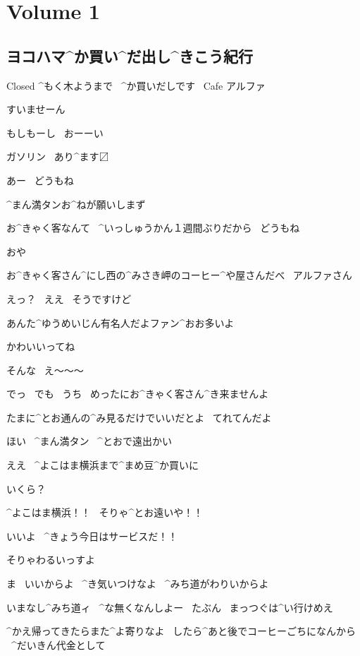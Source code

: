 \section{Volume 1}

\subsection{ヨコハマ^{か}{買}い^{だ}{出}し^{きこう}{紀行}}

\page[9]
\Sign Closed ^{もく}{木}ようまで
\ ^{か}{買}いだしです
\ Cafe アルファ

\page
\Alpha すいませーん

\Alpha もしもーし
\ おーーい

\Sign ガソリン
\ あり^{ます}{〼}

\page
\Ojisan あー
\ どうもね

\Alpha ^{まん}{満}タンお^{ねが}{願}いしまず

\Ojisan お^{きゃく}{客}なんて
\ ^{いっしゅうかん}{１週間}ぶりだから
\ どうもね

\Ojisan おや

\page
\Ojisan お^{きゃく}{客}さん^{にし}{西}の^{みさき}{岬}のコーヒー^{や}{屋}さんだべ
\ アルファさん

\Alpha えっ？
\ ええ
\ そうですけど

\Ojisan あんた^{ゆうめいじん}{有名人}だよファン^{おお}{多}いよ

\Ojisan かわいいってね

\Alpha そんな
\ え〜〜〜

\Alpha でっ
\ でも
\ うち
\ めったにお^{きゃく}{客}さん^{き}{来}ませんよ

\Ojisan たまに^{とお}{通}んの^{み}{見}るだけでいいだとよ
\ てれてんだよ

\page
\Ojisan ほい
\ ^{まん}{満}タン
\ ^{とおで}{遠出}かい

\Alpha ええ
\ ^{よこはま}{横浜}まで^{まめ}{豆}^{か}{買}いに

\Alpha いくら？

\Ojisan ^{よこはま}{横浜}！！
\ そりゃ^{とお}{遠}いや！！

\Ojisan いいよ
\ ^{きょう}{今日}はサービスだ！！

\Alpha そりゃわるいっすよ

\Ojisan ま
\ いいからよ
\ ^{き}{気}いつけなよ
\ ^{みち}{道}がわりいからよ

\Ojisan いまなし^{みち}{道}ィ
\ ^{な}{無}くなんしよー
\ たぶん
\ まっつぐは^{い}{行}けめえ

\page
\Ojisan ^{かえ}{帰}ってきたらまた^{よ}{寄}りなよ
\ したら^{あと}{後}でコーヒーごちになんから
\ ^{だいきん}{代金}として

